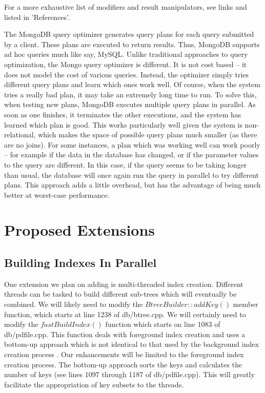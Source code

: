 \documentclass{dependencies/acm_proc_article-sp}
\begin{document}
For a more exhaustive list of modifiers and result manipulators, see links\cite{11} and \cite{12} listed in 'References'.

The MongoDB query optimizer generates query plans for each query submitted by a client.
These plans are executed to return results.
Thus, MongoDB supports ad hoc queries much like say, MySQL.
Unlike traditional approaches to query optimization, the Mongo query optimizer is different.
It is not cost based -- it does not model the cost of various queries.
Instead, the optimizer simply tries different query plans and learn which ones work well.
Of course, when the system tries a really bad plan, it may take an extremely long time to run.
To solve this, when testing new plans, MongoDB executes multiple query plans in parallel.
As soon as one finishes, it terminates the other executions, and the system has learned which plan is good.
This works particularly well given the system is non-relational, which makes the space of possible query plans much smaller (as there are no joins).
For some instances, a plan which was working well can work poorly -- for example if the data in the database has changed, or if the parameter values to the query are different.
In this case, if the query seems to be taking longer than usual, the database will once again run the query in parallel to try different plans.
This approach adds a little overhead, but has the advantage of being much better at worst-case performance\cite{13}.
\section{Proposed Extensions}
\subsection{Building Indexes In Parallel}
One extension we plan on adding is multi-threaded index creation.
Different threads can be tasked to build different sub-trees which will eventually be combined. 
We will likely need to modify the $BtreeBuilder::addKey()$ member function, which starts at line 1238 of db/btree.cpp.  We will certainly need to modify the $fastBuildIndex()$ function which starts on line 1083 of db/pdfile.cpp.  This function deals with foreground index creation and uses a bottom-up approach which is not identical to that used by the background index creation process \cite{17}.  Our enhancements will be limited to the foreground index creation process.  The bottom-up approach sorts the keys and calculates the number of keys (see lines 1097 through 1187 of db/pdfile.cpp).  This will greatly facilitate the appropriation of key subsets to the threads. 
\end{document}
